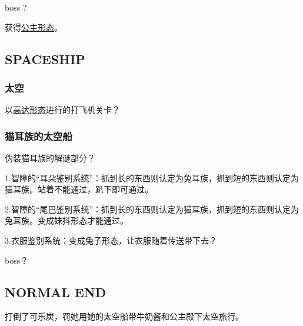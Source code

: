 \documentclass{article}
\begin{document}
boss ?

获得\hyperref[costume_hime]{公主形态}。

\subsection{SPACESHIP}

\subsubsection{太空}

以\hyperref[costume_gundam]{高达形态}进行的打飞机关卡？

\subsubsection{猫耳族的太空船}

伪装猫耳族的解谜部分？

1.智障的“耳朵鉴别系统”：抓到长的东西则认定为兔耳族，抓到短的东西则认定为猫耳族。站着不能通过，趴下即可通过。

2.智障的“尾巴鉴别系统”：抓到长的东西则认定为猫耳族，抓到短的东西则认定为兔耳族。变成妹抖形态才能通过。

3.衣服鉴别系统：变成兔子形态，让衣服随着传送带下去？

boss？

\subsection{NORMAL END}

打倒了可乐炭，罚她用她的太空船带牛奶酱和公主殿下太空旅行。
\end{document}
